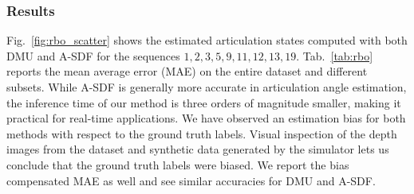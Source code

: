 \documentclass[letterpaper, 10 pt, journal, twoside]{ieeetran}  %
\begin{document}
\subsubsection*{Results}
Fig.~\ref{fig:rbo_scatter} shows the estimated articulation states computed with both DMU and A-SDF for the sequences ${1, 2, 3, 5, 9, 11, 12, 13, 19}$. Tab.~\ref{tab:rbo} reports the mean average error (MAE) on the entire dataset and different subsets.
While A-SDF is generally more accurate in articulation angle estimation, the inference time of our method is three orders of magnitude smaller, making it practical for real-time applications.
We have observed an estimation bias for both methods with respect to the ground truth labels. Visual inspection of the depth images from the dataset and synthetic data generated by the simulator lets us conclude that the ground truth labels were biased. We report the bias compensated MAE as well and see similar accuracies for DMU and A-SDF.
\end{document}
